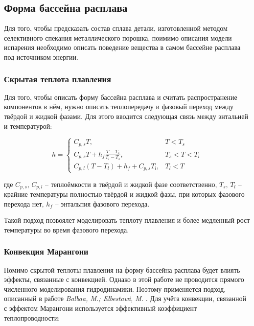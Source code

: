 
\subsection{Форма бассейна расплава}

Для того, чтобы предсказать состав сплава детали, изготовленной методом селективного спекания металлического порошка, поимимо описания модели испарения необходимо описать поведение вещества в самом бассейне расплава под источником энергии. 

\subsubsection{Скрытая теплота плавления}

Для того, чтобы описать форму бассейна расплава и считать распространение компонентов в нём, нужно описать теплопередачу и фазовый переход между твёрдой и жидкой фазами.
Для этого вводится следующая связь между энтальией и температурой:

\begin{equation}
h=
\begin{cases}
    C_{p,s}T, & T<T_s \\
    C_{p,s}T + h_f\frac{T-T_s}{T_l-T_s}, & T_s <T<T_l \\
    C_{p,l}(T-T_l) + h_f + C_{p,s}T_l, & T_l < T
\end{cases}
\end{equation}

\noindent
где $C_{p,s}$, $C_{p,l}$ -- теплоёмкости в твёрдой и жидкой фазе соответственно, $T_s$, $T_l$ -- крайние температуры полностью твёрдой и жидкой фазы, при которых фазового перехода нет, $h_f$  -- энтальпия фазового перехода.


Такой подход позвоялет моделировать теплоту плавления и более медленный рост температуры во время фазового перехода.

\subsubsection{Конвекция Марангони}

Помимо скрытой теплоты плавления на форму бассейна расплава будет влиять эффекты, связанные с конвекцией. Однако в этой работе не проводится прямого численного моделирования гидродинамики. Поэтому применяется подход, описанный в работе 
\textit{Balbaa, M.; Elbestawi, M.} 
\cite{balbaa2022multi}.
Для учёта конвекции, связанной с эффектом Марангони используется эффективный коэффициент теплопроводности:

